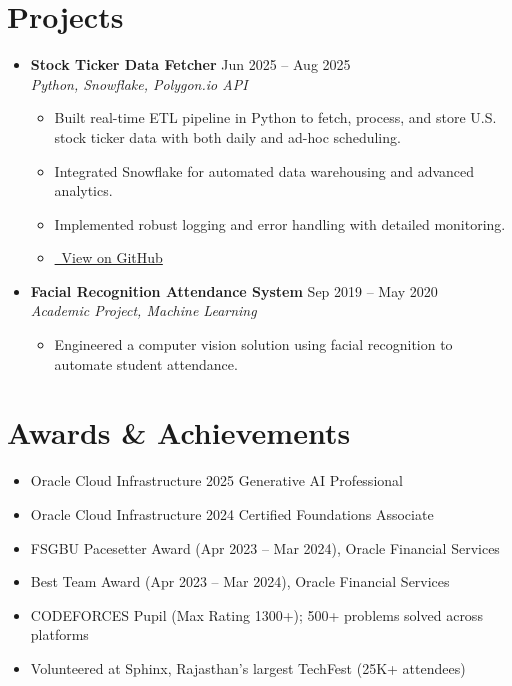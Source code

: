\documentclass[a4paper,10pt]{article}
\newcommand{\resumeItem}[1]{\item\small{#1}}
\newcommand{\resumeSubheading}[4]{
  \vspace{-2pt}\item
    \textbf{#1} \hfill {#2} \\
    \textit{#3} \hfill {#4} \vspace{-2pt}
}
\newcommand{\resumeSubHeadingListStart}{\begin{itemize}[leftmargin=0.15in, label={}]}
\newcommand{\resumeSubHeadingListEnd}{\end{itemize}}
\newcommand{\resumeItemListStart}{\begin{itemize}}
\newcommand{\resumeItemListEnd}{\end{itemize}\vspace{-5pt}}
\begin{document}
\section{Projects}
\resumeSubHeadingListStart
  \resumeSubheading
    {Stock Ticker Data Fetcher}{Jun 2025 -- Aug 2025}
    {Python, Snowflake, Polygon.io API}{}
  \resumeItemListStart
    \resumeItem{Built real-time ETL pipeline in Python to fetch, process, and store U.S. stock ticker data with both daily and ad-hoc scheduling.}
    \resumeItem{Integrated Snowflake for automated data warehousing and advanced analytics.}
    \resumeItem{Implemented robust logging and error handling with detailed monitoring.}
    \resumeItem{\href{https://github.com/aditya-raj-1710/stock-trading-python-app}{\faGithub\ View on GitHub}}
  \resumeItemListEnd
  \resumeSubheading
    {Facial Recognition Attendance System}{Sep 2019 -- May 2020}
    {Academic Project, Machine Learning}{}
  \resumeItemListStart
    \resumeItem{Engineered a computer vision solution using facial recognition to automate student attendance.}
  \resumeItemListEnd
\resumeSubHeadingListEnd

\section{Awards \& Achievements}
\resumeItemListStart
  \resumeItem{Oracle Cloud Infrastructure 2025 Generative AI Professional}
  \resumeItem{Oracle Cloud Infrastructure 2024 Certified Foundations Associate}
  \resumeItem{FSGBU Pacesetter Award (Apr 2023 -- Mar 2024), Oracle Financial Services}
  \resumeItem{Best Team Award (Apr 2023 -- Mar 2024), Oracle Financial Services}
  \resumeItem{CODEFORCES Pupil (Max Rating 1300+); 500+ problems solved across platforms}
  \resumeItem{Volunteered at Sphinx, Rajasthan's largest TechFest (25K+ attendees)}
\resumeItemListEnd
\end{document}
